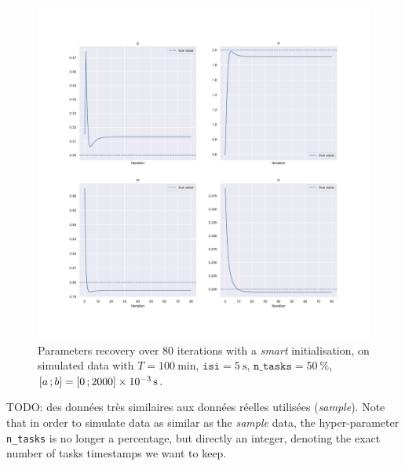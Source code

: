 \begin{figure}[h!]
    \centering
    \includegraphics[width=\textwidth]{pics/results/history_params_2.pdf}
    \caption{Parameters recovery over 80 iterations with a \textit{smart} initialisation, on simulated data with $T = \SI{100}{\minute}$, $\texttt{isi}=\SI{5}{\second}$, $\texttt{n\_tasks} = \SI{50}{\percent}$, $\left[ a \, ; b \right] = \left[ 0 \, ; 2000 \right]\times \SI{e-3}{\second}$.}
    \label{fig:history_params_2}
\end{figure}

TODO: des données très similaires aux données réelles utilisées (\textit{sample}).
Note that in order to simulate data as similar as the \textit{sample} data, the hyper-parameter \texttt{n\_tasks} is no longer a percentage, but directly an integer, denoting the exact number of tasks timestamps we want to keep.

